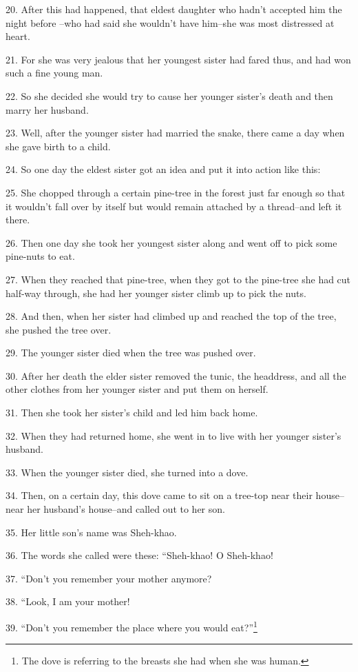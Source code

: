 20. After this had happened, that eldest daughter who hadn't accepted him the night
before --who had said she wouldn't have him--she was most distressed at heart.

21. For she was very jealous that her youngest sister had fared thus, and had won
such a fine young man.

22. So she decided she would try to cause her younger sister's death and then marry
her husband.

23. Well, after the younger sister had married the snake, there came a day when
she gave birth to a child.

24. So one day the eldest sister got an idea and put it into action like this:

25. She chopped through a certain pine-tree in the forest just far enough so that
it wouldn't fall over by itself but would remain attached by a thread--and left
it there.

26. Then one day she took her youngest sister along and went off to pick some pine-nuts
to eat.

27. When they reached that pine-tree, when they got to the pine-tree she had cut
half-way through, she had her younger sister climb up to pick the nuts.

28. And then, when her sister had climbed up and reached the top of the tree, she
pushed the tree over.

29. The younger sister died when the tree was pushed over.

30. After her death the elder sister removed the tunic, the headdress, and all
the other clothes from her younger sister and put them on herself.

31. Then she took her sister's child and led him back home.

32. When they had returned home, she went in to live with her younger sister's
husband.

33. When the younger sister died, she turned into a dove.

34. Then, on a certain day, this dove came to sit on a tree-top near their house--near
her husband's house--and called out to her son.

35. Her little son's name was Sheh-khao.

36. The words she called were these: ``Sheh-khao! O Sheh-khao!

37. ``Don't you remember your mother anymore?

38. ``Look, I am your mother!

39. ``Don't you remember the place where you would eat?''\footnote{The dove is referring to the breasts she had when she was human.}

